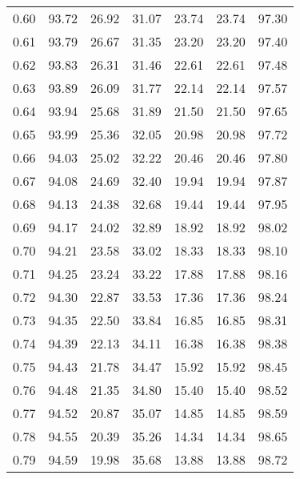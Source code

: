 \begin{tabular}{|c|c|c|c|c|c|c|}
      0.60 &     93.72 &     26.92 &      31.07 &   23.74 &      23.74 &         97.30 \\
      0.61 &     93.79 &     26.67 &      31.35 &   23.20 &      23.20 &         97.40 \\
      0.62 &     93.83 &     26.31 &      31.46 &   22.61 &      22.61 &         97.48 \\
      0.63 &     93.89 &     26.09 &      31.77 &   22.14 &      22.14 &         97.57 \\
      0.64 &     93.94 &     25.68 &      31.89 &   21.50 &      21.50 &         97.65 \\
      0.65 &     93.99 &     25.36 &      32.05 &   20.98 &      20.98 &         97.72 \\
      0.66 &     94.03 &     25.02 &      32.22 &   20.46 &      20.46 &         97.80 \\
      0.67 &     94.08 &     24.69 &      32.40 &   19.94 &      19.94 &         97.87 \\
      0.68 &     94.13 &     24.38 &      32.68 &   19.44 &      19.44 &         97.95 \\
      0.69 &     94.17 &     24.02 &      32.89 &   18.92 &      18.92 &         98.02 \\
      0.70 &     94.21 &     23.58 &      33.02 &   18.33 &      18.33 &         98.10 \\
      0.71 &     94.25 &     23.24 &      33.22 &   17.88 &      17.88 &         98.16 \\
      0.72 &     94.30 &     22.87 &      33.53 &   17.36 &      17.36 &         98.24 \\
      0.73 &     94.35 &     22.50 &      33.84 &   16.85 &      16.85 &         98.31 \\
      0.74 &     94.39 &     22.13 &      34.11 &   16.38 &      16.38 &         98.38 \\
      0.75 &     94.43 &     21.78 &      34.47 &   15.92 &      15.92 &         98.45 \\
      0.76 &     94.48 &     21.35 &      34.80 &   15.40 &      15.40 &         98.52 \\
      0.77 &     94.52 &     20.87 &      35.07 &   14.85 &      14.85 &         98.59 \\
      0.78 &     94.55 &     20.39 &      35.26 &   14.34 &      14.34 &         98.65 \\
      0.79 &     94.59 &     19.98 &      35.68 &   13.88 &      13.88 &         98.72 \\

\end{tabular}
